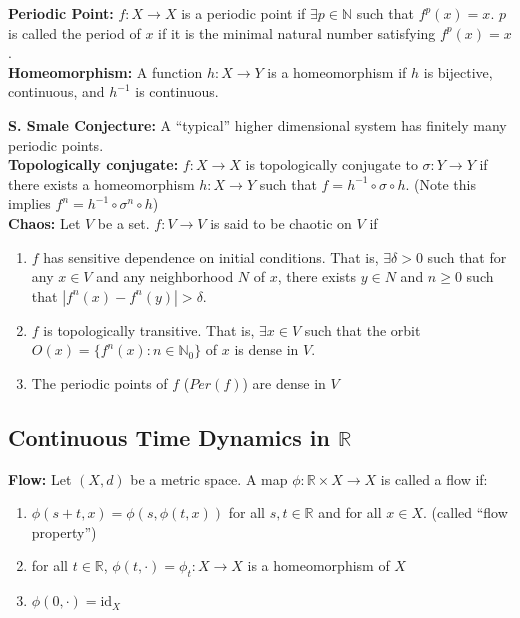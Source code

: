 \documentclass[12pt]{article}
\begin{document}
\textbf{Periodic Point:} $f: X \to X$ is a periodic point if $\exists p \in \mathbb{N}$ such that $f^p(x) = x$. $p$ is called the period of $x$ if it is the minimal natural number satisfying $f^p(x) = x$.\\

\textbf{Homeomorphism:} A function $h: X \to Y$ is a homeomorphism if $h$ is bijective, continuous, and $h^{-1}$ is continuous.

\textbf{S. Smale Conjecture:} A ``typical'' higher dimensional system has finitely many periodic points.\\

\textbf{Topologically conjugate:} $f: X \to X$ is topologically conjugate to $\sigma: Y \to Y$ if there exists a homeomorphism $h: X \to Y$ such that $f = h^{-1} \circ \sigma \circ h$. (Note this implies $f^n = h^{-1} \circ \sigma^n \circ h$)\\

\textbf{Chaos:} Let $V$ be a set. $f: V \to V$ is said to be chaotic on $V$ if
\begin{enumerate}
\item $f$ has sensitive dependence on initial conditions. That is, $\exists \delta > 0$ such that for any $x \in V$ and any neighborhood $N$ of $x$, there exists $y \in N$ and $n \geq 0$ such that $|f^n(x) - f^n(y)| > \delta$.
\item $f$ is topologically transitive. That is, $\exists x \in V$ such that the orbit $O(x) = \{f^n(x): n \in \mathbb{N}_0\}$ of $x$ is dense in $V$.
\item The periodic points of $f$ ($Per(f)$) are dense in $V$
\end{enumerate}

\subsection{Continuous Time Dynamics in $\mathbb{R}$}

\textbf{Flow:} Let $(X, d)$ be a metric space. A map $\phi: \mathbb{R} \times X \to X$ is called a flow if:
\begin{enumerate}
\item $\phi(s + t, x) = \phi(s, \phi(t, x))$ for all $s, t \in \mathbb{R}$ and for all $x \in X$. (called ``flow property'')
\item for all $t \in \mathbb{R}$, $\phi(t, \cdot) = \phi_t: X \to X$ is a homeomorphism of $X$
\item $\phi(0, \cdot) = \text{id}_X$
\end{enumerate}
\end{document}
